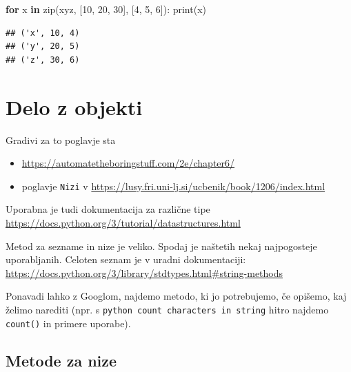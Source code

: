 \documentclass[
]{report}
\newenvironment{Shaded}{\begin{snugshade}}{\end{snugshade}}
\newcommand{\BuiltInTok}[1]{#1}
\newcommand{\ControlFlowTok}[1]{\textcolor[rgb]{0.13,0.29,0.53}{\textbf{#1}}}
\newcommand{\DecValTok}[1]{\textcolor[rgb]{0.00,0.00,0.81}{#1}}
\newcommand{\KeywordTok}[1]{\textcolor[rgb]{0.13,0.29,0.53}{\textbf{#1}}}
\newcommand{\NormalTok}[1]{#1}
\newcommand{\StringTok}[1]{\textcolor[rgb]{0.31,0.60,0.02}{#1}}
\providecommand{\tightlist}{%
  \setlength{\itemsep}{0pt}\setlength{\parskip}{0pt}}
\begin{document}
\begin{Shaded}
\begin{Highlighting}[]
\ControlFlowTok{for}\NormalTok{ x }\KeywordTok{in} \BuiltInTok{zip}\NormalTok{(}\StringTok{\textquotesingle{}xyz\textquotesingle{}}\NormalTok{, [}\DecValTok{10}\NormalTok{, }\DecValTok{20}\NormalTok{, }\DecValTok{30}\NormalTok{], [}\DecValTok{4}\NormalTok{, }\DecValTok{5}\NormalTok{, }\DecValTok{6}\NormalTok{]):}
    \BuiltInTok{print}\NormalTok{(x)}
\end{Highlighting}
\end{Shaded}

\begin{verbatim}
## ('x', 10, 4)
## ('y', 20, 5)
## ('z', 30, 6)
\end{verbatim}

\hypertarget{delo-z-objekti}{%
\chapter{Delo z objekti}\label{delo-z-objekti}}

Gradivi za to poglavje sta

\begin{itemize}
\tightlist
\item
  \url{https://automatetheboringstuff.com/2e/chapter6/}
\item
  poglavje \texttt{Nizi} v \url{https://lusy.fri.uni-lj.si/ucbenik/book/1206/index.html}
\end{itemize}

Uporabna je tudi dokumentacija za različne tipe \url{https://docs.python.org/3/tutorial/datastructures.html}

Metod za sezname in nize je veliko. Spodaj je naštetih nekaj najpogosteje uporabljanih. Celoten seznam je v uradni dokumentaciji: \url{https://docs.python.org/3/library/stdtypes.html\#string-methods}

Ponavadi lahko z Googlom, najdemo metodo, ki jo potrebujemo, če opišemo, kaj želimo
narediti (npr. s \texttt{python\ count\ characters\ in\ string} hitro najdemo \texttt{count()} in primere uporabe).

\hypertarget{metode-za-nize}{%
\section{Metode za nize}\label{metode-za-nize}}
\end{document}
